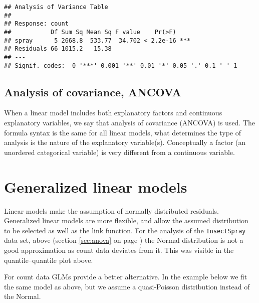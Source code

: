 \begin{knitrout}
\color{fgcolor}\begin{kframe}
\begin{alltt}
\end{alltt}
\begin{verbatim}
## Analysis of Variance Table
## 
## Response: count
##           Df Sum Sq Mean Sq F value    Pr(>F)    
## spray      5 2668.8  533.77  34.702 < 2.2e-16 ***
## Residuals 66 1015.2   15.38                      
## ---
## Signif. codes:  0 '***' 0.001 '**' 0.01 '*' 0.05 '.' 0.1 ' ' 1
\end{verbatim}
\end{kframe}
\end{knitrout}

\subsection{Analysis of covariance, ANCOVA}

When a linear model includes both explanatory factors and continuous explanatory variables, we say that analysis of covariance (ANCOVA) is used. The formula syntax is the same for all linear models, what determines the type of analysis is the nature of the explanatory variable(s). Conceptually a factor (an unordered categorical variable) is very different from a continuous variable.

\section{Generalized linear models}

Linear models make the assumption of normally distributed residuals. Generalized linear models are more flexible, and allow the assumed distribution to be selected as well as the link function.
For the analysis of the \texttt{InsectSpray} data set, above (section \ref{sec:anova} on page \pageref{sec:anova}) the Normal distribution is not a good approximation as count data deviates from it. This was visible in the quantile--quantile plot above.

For count data GLMs provide a better alternative. In the example below we fit the same model as above, but we assume a quasi-Poisson distribution instead of the Normal.

